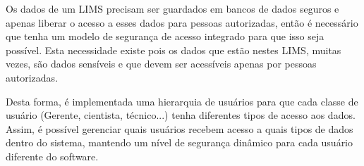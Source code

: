 

Os dados de um LIMS precisam ser guardados em bancos de dados seguros e apenas liberar o acesso a esses dados para pessoas autorizadas, então é necessário que tenha um modelo de segurança de acesso integrado para que isso seja possível. Esta necessidade existe pois os dados que estão nestes LIMS, muitas vezes, são dados sensíveis e que devem ser acessíveis apenas por pessoas autorizadas.


Desta forma, é implementada uma hierarquia de usuários para que cada classe de usuário (Gerente, cientista, técnico...) tenha diferentes tipos de acesso aos dados. Assim, é possível gerenciar quais usuários recebem acesso a quais tipos de dados dentro do sistema, mantendo um nível de segurança dinâmico para cada usuário diferente do software.







